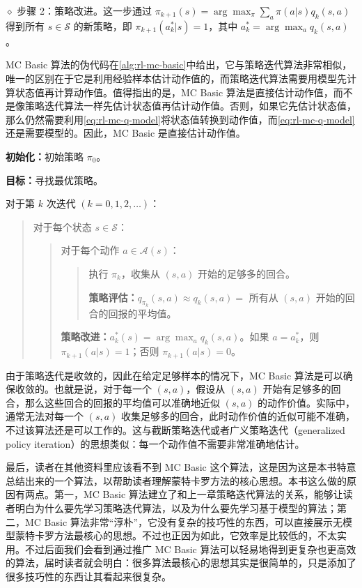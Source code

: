 $\diamond$ 步骤 2：策略改进。这一步通过 $\pi_{k+1}(s) = \arg\max_{\pi} \sum_{a} \pi(a|s) q_{k}(s,a)$ 得到所有 $s \in \mathcal{S}$ 的新策略，即 $\pi_{k+1}(a_k^{*}|s) = 1$，其中 $a_{k}^{*} = \arg\max_{a} q_{k}(s,a)$。

MC Basic 算法的伪代码在\cref{alg:rl-mc-basic}中给出，它与策略迭代算法非常相似，唯一的区别在于它是利用经验样本估计动作值的，而策略迭代算法需要用模型先计算状态值再计算动作值。值得指出的是，MC Basic 算法是直接估计动作值，而不是像策略迭代算法一样先估计状态值再估计动作值。否则，如果它先估计状态值，那么仍然需要利用\cref{eq:rl-mc-q-model}将状态值转换到动作值，而\cref{eq:rl-mc-q-model}还是需要模型的。因此，MC Basic 是直接估计动作值。

\begin{algo}
\label{alg:rl-mc-basic}
\textbf{初始化：}初始策略 $\pi_{0}$。

\textbf{目标：}寻找最优策略。

\medskip
对于第 $k$ 次迭代 $(k = 0, 1, 2, \ldots)$：
\begin{quote}
对于每个状态 $s \in \mathcal{S}$：
\begin{quote}
对于每个动作 $a \in \mathcal{A}(s)$：
\begin{quote}
执行 $\pi_{k}$，收集从 $(s,a)$ 开始的足够多的回合。

\textbf{策略评估：}$q_{\pi_{k}}(s,a) \approx q_{k}(s,a) = $ 所有从 $(s,a)$ 开始的回合的回报的平均值。
\end{quote}
\textbf{策略改进：}$a_{k}^{*}(s) = \arg\max_{a} q_{k}(s,a)$。如果 $a = a_{k}^{*}$，则 $\pi_{k+1}(a|s) = 1$；否则 $\pi_{k+1}(a|s) = 0$。
\end{quote}
\end{quote}
\end{algo}

由于策略迭代是收敛的，因此在给定足够样本的情况下，MC Basic 算法是可以确保收敛的。也就是说，对于每一个 $(s, a)$，假设从 $(s, a)$ 开始有足够多的回合，那么这些回合的回报的平均值可以准确地近似 $(s, a)$ 的动作价值。实际中，通常无法对每一个 $(s, a)$ 收集足够多的回合，此时动作价值的近似可能不准确，不过该算法还是可以工作的。这与截断策略迭代或者广义策略迭代（generalized policy iteration）的思想类似：每一个动作值不需要非常准确地估计。

最后，读者在其他资料里应该看不到 MC Basic 这个算法，这是因为这是本书特意总结出来的一个算法，以帮助读者理解蒙特卡罗方法的核心思想。本书这么做的原因有两点。第一，MC Basic 算法建立了和上一章策略迭代算法的关系，能够让读者明白为什么要先学习策略迭代算法，以及为什么要先学习基于模型的算法；第二，MC Basic 算法非常“淳朴”，它没有复杂的技巧性的东西，可以直接展示无模型蒙特卡罗方法最核心的思想。不过也正因为如此，它效率是比较低的，不太实用。不过后面我们会看到通过推广 MC Basic 算法可以轻易地得到更复杂也更高效的算法，届时读者就会明白：很多算法最核心的思想其实是很简单的，只是添加了很多技巧性的东西让其看起来很复杂。

